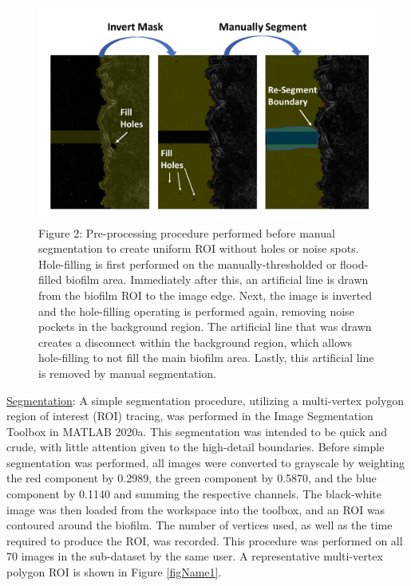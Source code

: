 \documentclass[conference]{IEEEtran}
\begin{document}
\begin{figure}[h]
\centering
\includegraphics[scale=0.25]{Slide2.PNG}
\caption{Figure 2: Pre-processing procedure performed before manual segmentation to create uniform ROI without holes or noise spots. Hole-filling is first performed on the manually-thresholded or flood-filled biofilm area. Immediately after this, an artificial line is drawn from the biofilm ROI to the image edge. Next, the image is inverted and the hole-filling operating is performed again, removing noise pockets in the background region. The artificial line that was drawn creates a disconnect within the background region, which allows hole-filling to not fill the main biofilm area. Lastly, this artificial line is removed by manual segmentation.}
\label{figName2}
\end{figure}

\ul{Segmentation}: A simple segmentation procedure, utilizing a multi-vertex polygon region of interest (ROI) tracing, was performed in the Image Segmentation Toolbox in MATLAB 2020a. This segmentation was intended to be quick and crude, with little attention given to the high-detail boundaries. Before simple segmentation was performed, all images were converted to grayscale by weighting the red component by 0.2989, the green component by 0.5870, and the blue component by 0.1140 and summing the respective channels. The black-white image was then loaded from the workspace into the toolbox, and an ROI was contoured around the biofilm. The number of vertices used, as well as the time required to produce the ROI, was recorded. This procedure was performed on all 70 images in the sub-dataset by the same user. A representative multi-vertex polygon ROI is shown in Figure \ref{figName1}. 
\end{document}
